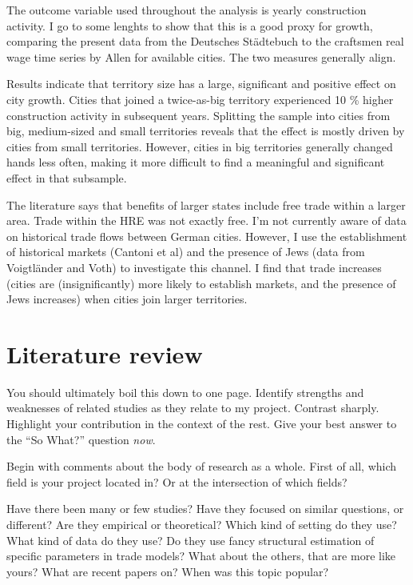\documentclass{article}
\begin{document}
The outcome variable used throughout the analysis is yearly construction activity. I go to some lenghts to show that this is a good proxy for growth, comparing the present data from the Deutsches St\"adtebuch to the craftsmen real wage time series by Allen for available cities. The two measures generally align.

Results indicate that territory size has a large, significant and positive effect on city growth. Cities that joined a twice-as-big territory experienced 10 \% higher construction activity in subsequent years. Splitting the sample into cities from big, medium-sized and small territories reveals that the effect is mostly driven by cities from small territories. However, cities in big territories generally changed hands less often, making it more difficult to find a meaningful and significant effect in that subsample.

The literature says that benefits of larger states include free trade within a larger area. Trade within the HRE was not exactly free. I'm not currently aware of data on historical trade flows between German cities. However, I use the establishment of historical markets (Cantoni et al) and the presence of Jews (data from Voigtl\"ander and Voth) to investigate this channel. I find that trade increases (cities are (insignificantly) more likely to establish markets, and the presence of Jews increases) when cities join larger territories.

\section{Literature review}

You should ultimately boil this down to one page. Identify strengths and weaknesses of related studies as they relate to my project. Contrast sharply. Highlight your contribution in the context of the rest. Give your best answer to the ``So What?'' question \textit{now}.

Begin with comments about the body of research as a whole. 
First of all, which field is your project located in? Or at the intersection of which fields?

Have there been many or few studies? Have they focused on similar questions, or different? Are they empirical or theoretical? Which kind of setting do they use? What kind of data do they use? Do they use fancy structural estimation of specific parameters in trade models? What about the others, that are more like yours? What are recent papers on? When was this topic popular?
\end{document}
